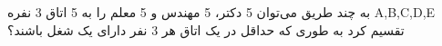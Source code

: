 \p    
به چند طریق می‌توان 5 دکتر، 5 مهندس و 5 معلم را به 5 اتاق 3 نفره A,B,C,D,E
تقسیم کرد به طوری که
حداقل در یک اتاق هر 3 نفر دارای یک شغل باشند؟

